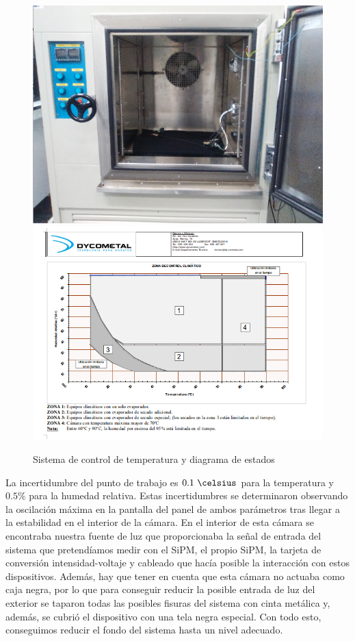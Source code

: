 \begin{enumerate}
\begin{figure}[htb]
\centering
{
\includegraphics[scale=0.3]{InteriorTemperatura.png} 
}
{
\includegraphics[scale=0.3]{FichaTecnica.png} 
}
\caption{Sistema de control de temperatura y diagrama de estados~\cite{dycometal}\label{sistematemperatura}}
\end{figure}

La incertidumbre  del punto de trabajo es $0.1~\celsius$ para la temperatura y $0.5\%$ para la humedad relativa. Estas incertidumbres se determinaron observando la oscilación  máxima en la pantalla del panel de ambos parámetros tras llegar a la estabilidad en el interior de la cámara.
En el interior de esta cámara se encontraba nuestra fuente de luz que proporcionaba la señal de entrada del sistema que pretendíamos medir con el SiPM, el propio SiPM, la tarjeta de conversión intensidad-voltaje y cableado que hacía posible la interacción con estos dispositivos. Además, hay que tener en cuenta que esta cámara no actuaba como caja negra, por lo que para conseguir reducir la posible entrada de luz del exterior se taparon todas las posibles fisuras del sistema con cinta metálica y, además, se cubrió el dispositivo con una tela negra especial. Con todo esto, conseguimos reducir el fondo del sistema hasta un nivel adecuado.


\end{enumerate}
